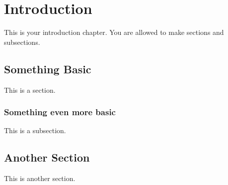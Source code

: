 \chapter{Introduction}\label{chap_intro}

This is your introduction chapter.
You are allowed to make sections and subsections.

\section{Something Basic}\label{sec_basic}
This is a section.

\subsection{Something even more basic}\label{subsec_basic}

This is a subsection.

\section{Another Section}\label{sec_another}

This is another section.

